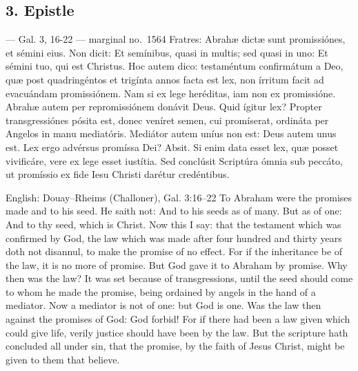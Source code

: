 \elementguard
\subsection*{3. Epistle }

\begin{appointedlatin}{ --- Gal. 3, 16-22 --- marginal no.\ 1564}
Fratres: Abrahæ dictæ sunt promissiónes, et sémini eius. Non dicit: Et
semínibus, quasi in multis; sed quasi in uno: Et sémini tuo, qui est Christus.
Hoc autem dico: testaméntum confirmátum a Deo, quæ post quadringéntos et
trigínta annos facta est lex, non írritum facit ad evacuándam promissiónem.
Nam si ex lege heréditas, iam non ex promissióne. Abrahæ autem per
repromissiónem donávit Deus. Quid ígitur lex? Propter transgressiónes pósita
est, donec veníret semen, cui promíserat, ordináta per Angelos in manu
mediatóris. Mediátor autem uníus non est: Deus autem unus est. Lex ergo
advérsus promíssa Dei? Absit. Si enim data esset lex, quæ posset vivificáre,
vere ex lege esset iustítia. Sed conclúsit Scriptúra ómnia sub peccáto, ut
promíssio ex fide Iesu Christi darétur credéntibus.
\end{appointedlatin}

\begin{namedtranslation}{English: Douay--Rheims (Challoner), Gal. 3:16--22}
To Abraham were the promises made and to his seed. He saith not: And to his
seeds as of many. But as of one: And to thy seed, which is Christ. Now this I
say: that the testament which was confirmed by God, the law which was made
after four hundred and thirty years doth not disannul, to make the promise of
no effect. For if the inheritance be of the law, it is no more of promise.
But God gave it to Abraham by promise. Why then was the law? It was set
because of transgressions, until the seed should come to whom he made the
promise, being ordained by angels in the hand of a mediator. Now a mediator is
not of one: but God is one. Was the law then against the promises of God: God
forbid! For if there had been a law given which could give life, verily
justice should have been by the law. But the scripture hath concluded all
under sin, that the promise, by the faith of Jesus Christ, might be given to
them that believe.
\end{namedtranslation}


